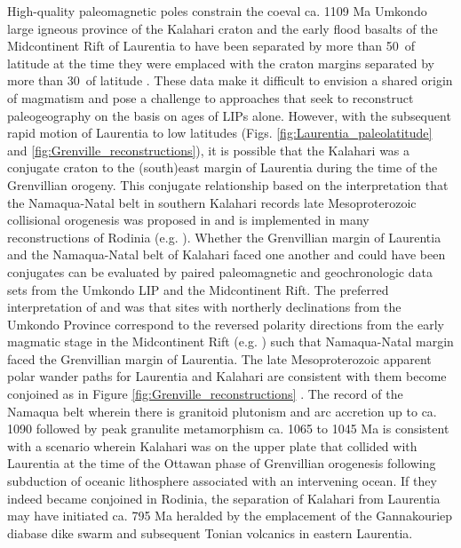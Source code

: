 \documentclass[twocolumn, switch]{article} %
\begin{document}
High-quality paleomagnetic poles constrain the coeval ca. 1109 Ma Umkondo large igneous province of the Kalahari craton and the early flood basalts of the Midcontinent Rift of Laurentia to have been separated by more than 50\textdegree\ of latitude at the time they were emplaced with the craton margins separated by more than 30\textdegree\ of latitude \citep{Swanson-Hysell2015a}. These data make it difficult to envision a shared origin of magmatism and pose a challenge to approaches that seek to reconstruct paleogeography on the basis on ages of LIPs alone. However, with the subsequent rapid motion of Laurentia to low latitudes (Figs. \ref{fig:Laurentia_paleolatitude} and \ref{fig:Grenville_reconstructions}), it is possible that the Kalahari was a conjugate craton to the (south)east margin of Laurentia during the time of the Grenvillian orogeny. This conjugate relationship based on the interpretation that the Namaqua-Natal belt in southern Kalahari records late Mesoproterozoic collisional orogenesis was  proposed in \cite{Hoffman1991a} and is implemented in many reconstructions of Rodinia (e.g. \citealp{Li2008a}). Whether the Grenvillian margin of Laurentia and the Namaqua-Natal belt of Kalahari faced one another and could have been conjugates can be evaluated by paired paleomagnetic and geochronologic data sets from the Umkondo LIP and the Midcontinent Rift. The preferred interpretation of \cite{Swanson-Hysell2015a} and \cite{Kasbohm2015a} was that sites with northerly declinations from the Umkondo Province correspond to the reversed polarity directions from the early magmatic stage in the Midcontinent Rift (e.g. \citealp{Swanson-Hysell2014a}) such that Namaqua-Natal margin faced the Grenvillian margin of Laurentia. The late Mesoproterozoic apparent polar wander paths for Laurentia and Kalahari are consistent with them become conjoined as in Figure \ref{fig:Grenville_reconstructions} \citep{Swanson-Hysell2015a}. The record of the Namaqua belt wherein there is granitoid plutonism and arc accretion up to ca. 1090 followed by peak granulite metamorphism ca. 1065 to 1045 Ma \citep{Diener2013a, Spencer2015a} is consistent with a scenario wherein Kalahari was on the upper plate that collided with Laurentia at the time of the Ottawan phase of Grenvillian orogenesis following subduction of oceanic lithosphere associated with an intervening ocean. If they indeed became conjoined in Rodinia, the separation of Kalahari from Laurentia may have initiated ca. 795 Ma heralded by the emplacement of the Gannakouriep diabase dike swarm \citep{Rioux2010a, DeKock2021a} and subsequent Tonian volcanics in eastern Laurentia. 
\end{document}
